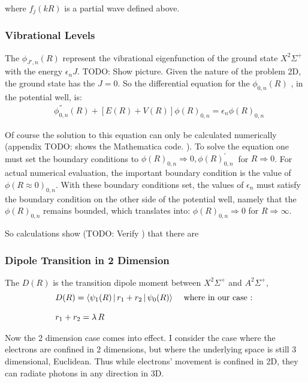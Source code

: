 where $ f_j(kR) $ is a partial wave defined above. 

\subsubsection{Vibrational Levels}

The $ \phi_{J',n}(R) $ represent the vibrational eigenfunction of the ground state   $ X^2\Sigma^{+} $ with the energy $ \epsilon_nJ $. TODO: Show picture.   Given the nature of the problem 2D, the ground state has the $ J = 0 $. So the differential equation for the  $ \phi_{0,n}(R) $ , in the potential well, is:
\begin{equation}
\begin{split}
& \phi_{0,n}^{''}(R) + \left[ E(R) + V(R)  \right]\phi(R)_{0,n} = \epsilon_n \phi(R)_{0,n}
\end{split}
\end{equation}

Of course the solution to this equation can only be calculated numerically (appendix TODO: shows the Mathematica code. ).  To solve the equation one must set the boundary conditions to  $ \phi(R)_{0,n} \Rightarrow 0, \phi(R)^{'}_{0,n} \ $ for $ R \Rightarrow 0 $. For actual numerical evaluation, the important boundary condition is the value of  $ \phi(R \approx 0 )_{0,n} $.  With these boundary conditions set, the values of $ \epsilon_n $ must satisfy the boundary condition on the other side of the potential well, namely  that the $ \phi(R)_{0,n} $ remains bounded, which translates into: $ \phi(R)_{0,n} \Rightarrow 0 $ for $ R \Rightarrow \infty $. 

So calculations show (TODO: Verify ) that there are 

\subsubsection{Dipole Transition in 2 Dimension}

The $ D(R) $ is the transition dipole moment  between $ X^2\Sigma^{+} $  and $ A^2\Sigma^{+} $, \begin{equation}
\begin{split}
& D(R) = \Braket{\psi_1(R) | r_1 +  r_2 | \psi_0(R) } \,\,\,\,\,\text{ where in our case : } \\[.8em]
& r_1 + r_2 = \lambda\, R
\end{split}
\end{equation}

Now the 2 dimension case comes into effect. I consider the case where the electrons are confined in 2 dimensions, but where the underlying space is still 3 dimensional, Euclidean. Thus while electrons' movement is confined in 2D, they can radiate photons in any direction in 3D.

